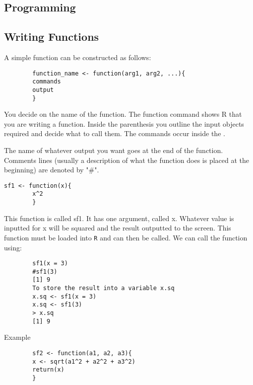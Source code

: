\documentclass[a4paper,12pt]{article}
\begin{document}
\begin{itemize}
		\newpage
		\chapter{Programming}
		
		\section{Writing Functions}
		
		A simple function can be constructed as follows:
		
		\begin{verbatim}
		function_name <- function(arg1, arg2, ...){
		commands
		output
		}
		\end{verbatim}
		
		You decide on the name of the function. The function command shows R that you are writing a function. Inside the parenthesis you outline the input objects required and decide what to call them. The commands occur inside the { }.
		
		The name of whatever output you want goes at the end of the function. Comments lines (usually a description of what the function does is placed at the beginning) are denoted by "\#".
		
		\begin{verbatim}sf1 <- function(x){
		x^2
		}
		\end{verbatim}
		
		This function is called sf1. It has one argument, called x.
		Whatever value is inputted for x will be squared and the result outputted to the screen. This function must be loaded into \texttt{R} and can then be called. We can call the function using:
		\begin{verbatim}
		sf1(x = 3)
		#sf1(3)
		[1] 9
		To store the result into a variable x.sq
		x.sq <- sf1(x = 3)
		x.sq <- sf1(3)
		> x.sq
		[1] 9
		\end{verbatim}
		Example
		\begin{verbatim}
		sf2 <- function(a1, a2, a3){
		x <- sqrt(a1^2 + a2^2 + a3^2)
		return(x)
		}
		\end{verbatim}
		

\end{itemize}
\end{document}
